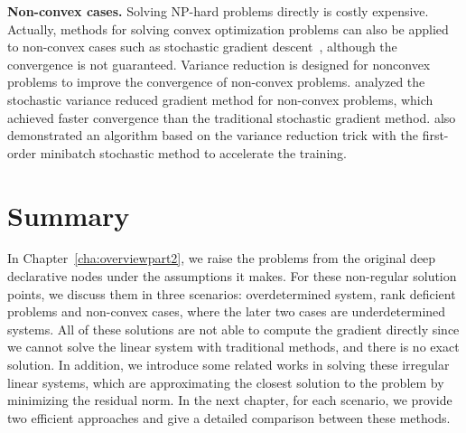 \par \textbf{Non-convex cases.} Solving NP-hard problems directly is costly expensive. Actually, methods for solving convex optimization problems can also be applied to non-convex cases such as stochastic gradient descent~\citep{RH:51}, although the convergence is not guaranteed. Variance reduction is designed for nonconvex problems to improve the convergence of non-convex problems. \cite{RS:16} analyzed the stochastic variance reduced gradient method for non-convex problems, which achieved faster convergence than the traditional stochastic gradient method. \cite{AZ:16} also demonstrated an algorithm based on the variance reduction trick with the first-order minibatch stochastic
method to accelerate the training. 

\section{Summary}
In Chapter~\ref{cha:overviewpart2}, we raise the problems from the original deep declarative nodes under the assumptions it makes. For these non-regular solution points, we discuss them in three scenarios: overdetermined system, rank deficient problems and non-convex cases, where the later two cases are underdetermined systems. All of these solutions are not able to compute the gradient directly since we cannot solve the linear system with traditional methods, and there is no exact solution. In addition, we introduce some related works in solving these irregular linear systems, which are approximating the closest solution to the problem by minimizing the residual norm. In the next chapter, for each scenario, we provide two efficient approaches and give a detailed comparison between these methods. 
